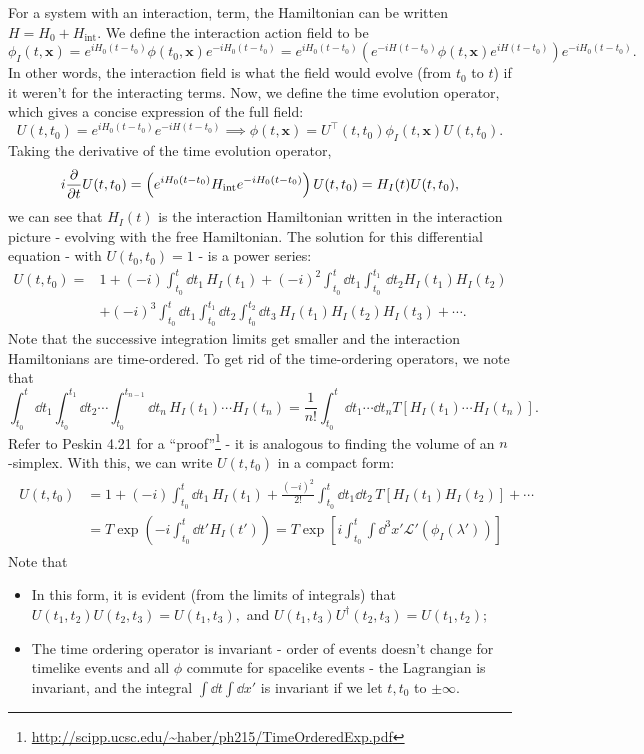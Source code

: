 \documentclass{article}
\begin{document}
For a system with an interaction, term, the Hamiltonian can be written $H=H_0+H_\text{int}$. We define the interaction action field to be 
$$\phi_I(t,\mathbf x)=e^{iH_0(t-t_0)}\phi(t_0,\mathbf x)e^{-iH_0(t-t_0)}=e^{iH_0(t-t_0)}\left(e^{-iH(t-t_0)}\phi(t,\mathbf x)e^{iH(t-t_0)}\right)e^{-iH_0(t-t_0)}.$$
In other words, the interaction field is what the field would evolve (from $t_0$ to $t$) if it weren't for the interacting terms. Now, we define the time evolution operator, which gives a concise expression of the full field:
$$U(t,t_0)=e^{iH_0(t-t_0)}e^{-iH(t-t_0)}\implies \phi(t,\mathbf x)=U^\intercal(t,t_0)\phi_I(t,\mathbf x)U(t,t_0).$$
Taking the derivative of the time evolution operator, 
$$i \frac{\partial }{\partial t}U(t,t_0)=\left(e^{iH_0(t-t_0)}H_\text{int} e^{-iH_0(t-t_0)}\right)U(t,t_0)=H_I(t)U(t,t_0),$$
we can see that $H_I(t)$ is the interaction Hamiltonian written in the interaction picture - evolving with the free Hamiltonian. The solution for this differential equation - with $U(t_0,t_0)=1$ - is a power series:
\begin{align*}
    U(t,t_0)=&1+(-i)\int^t_{t_0}\dd t_1\,H_I(t_1)+(-i)^2\int^t_{t_0}\dd t_1\int^{t_1}_{t_0}\,\dd t_2H_I(t_1)H_I(t_2)\\
    &+(-i)^3\int^t_{t_0}\dd t_1\int^{t_1}_{t_0}\dd t_2\int^{t_2}_{t_0}\dd t_3\,H_I(t_1)H_I(t_2)H_I(t_3)+\cdots.
\end{align*}
Note that the successive integration limits get smaller and the interaction Hamiltonians are time-ordered. To get rid of the time-ordering operators, we note that 
$$\int^t_{t_0}\dd t_1\int^{t_1}_{t_0}\dd t_2\cdots\int^{t_{n-1}}_{t_0}\dd t_n\,H_I(t_1)\cdots H_I(t_n)=\frac 1{n!}\int^t_{t_0}\dd t_1\cdots\dd t_n T\left[H_I(t_1)\cdots H_I(t_n)\right].$$
Refer to Peskin 4.21 for a ``proof''\footnote{\url{http://scipp.ucsc.edu/~haber/ph215/TimeOrderedExp.pdf}} - it is analogous to finding the volume of an $n$-simplex. With this, we can write $U(t,t_0)$ in a compact form:
\begin{align}
    \begin{split}
        U(t,t_0)&=1+(-i)\int^t_{t_0}\dd t_1\,H_I(t_1)+\frac{(-i)^2}{2!}\int^t_{t_0}\dd t_1\dd t_2\,T[H_I(t_1)H_I(t_2)]+\cdots\\
        &=T\exp\left(-i\int^t_{t_0}\dd t'H_I(t')\right)=T\exp\left[i\int^t_{t_0}\int\dd^3x'\mathcal L'(\phi_I(\lambda'))\right]
    \end{split}
\end{align}
Note that 
\begin{itemize}
    \item In this form, it is evident (from the limits of integrals) that $U(t_1,t_2)U(t_2,t_3)=U(t_1,t_3),$ and $U(t_1,t_3)U^\dag(t_2,t_3)=U(t_1,t_2);$
    \item The time ordering operator is invariant - order of events doesn't change for timelike events and all $\phi$ commute for spacelike events - the Lagrangian is invariant, and the integral $\int\dd t\int\dd x'$ is invariant if we let $t,t_0$ to $\pm\infty$.
\end{itemize}
\end{document}
